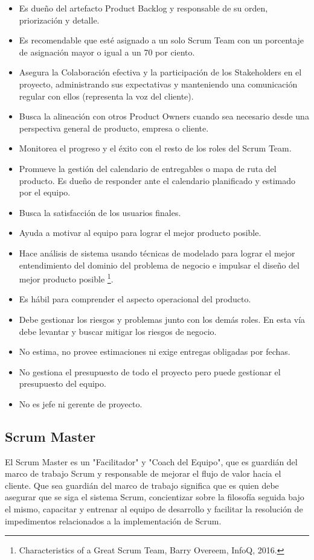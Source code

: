 \begin{itemize}
\item Es dueño del artefacto Product Backlog y responsable de su orden, priorización y detalle.
\item Es recomendable que esté asignado a un solo Scrum Team con un porcentaje de asignación mayor o igual a un 70 por ciento.
\item Asegura la Colaboración efectiva y la participación de los Stakeholders en el proyecto, administrando sus expectativas y manteniendo una comunicación regular con ellos (representa la voz del cliente).
\item Busca la alineación con otros Product Owners cuando sea necesario desde una perspectiva general de producto, empresa o cliente.
\item Monitorea el progreso y el éxito con el resto de los roles del Scrum Team. 
\item Promueve la gestión del calendario de entregables o mapa de ruta del producto. Es dueño de responder ante el calendario planificado y estimado por el equipo.
\item Busca la satisfacción de los usuarios finales.
\item Ayuda a motivar al equipo para lograr el mejor producto posible.
\item Hace análisis de sistema usando técnicas de modelado para lograr el mejor entendimiento del dominio del problema de negocio e impulsar el diseño del mejor producto posible \footnote{Characteristics of a Great Scrum Team, Barry Overeem, InfoQ, 2016.}.
\item Es hábil para comprender el aspecto operacional del producto.
\item Debe gestionar los riesgos y problemas junto con los demás roles. En esta vía debe levantar y buscar mitigar los riesgos de negocio.
\item No estima, no provee estimaciones ni exige entregas obligadas por fechas.
\item No gestiona el presupuesto de todo el proyecto pero puede gestionar el presupuesto del equipo.
\item No es jefe ni gerente de proyecto.
\end{itemize}

\subsection{Scrum Master}

El Scrum Master es un "Facilitador" y "Coach del Equipo", que es guardián del marco de trabajo Scrum y responsable de mejorar el flujo de valor hacia el cliente. Que sea guardián del marco de trabajo significa que es quien debe asegurar que se siga el sistema Scrum, concientizar sobre la filosofía seguida bajo el mismo, capacitar y entrenar al equipo de desarrollo y facilitar la resolución de impedimentos relacionados a la implementación de Scrum.

